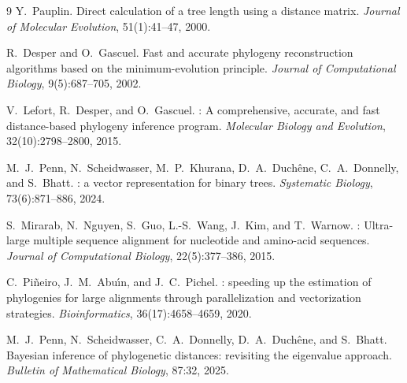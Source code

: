 \documentclass[11pt,a4paper]{article}
\makeatletter
\DeclareRobustCommand{\_}{\ifmmode\nfss@text{\textunderscore}\else\textunderscore\allowbreak\fi}
\theoremstyle{definition}
\makeatother
\begin{document}
\begin{thebibliography}{9}
Y.~Pauplin.
\newblock Direct calculation of a tree length using a distance matrix.
\newblock \emph{Journal of Molecular Evolution}, 51(1):41--47, 2000.

R.~Desper and O.~Gascuel.
\newblock Fast and accurate phylogeny reconstruction algorithms based on the minimum-evolution principle.
\newblock \emph{Journal of Computational Biology}, 9(5):687--705, 2002.

V.~Lefort, R.~Desper, and O.~Gascuel.
: A comprehensive, accurate, and fast distance-based phylogeny inference program.
\newblock \emph{Molecular Biology and Evolution}, 32(10):2798--2800, 2015.

M.~J.~Penn, N.~Scheidwasser, M.~P.~Khurana, D.~A.~Duch\^ene, C.~A.~Donnelly, and S.~Bhatt.
: a vector representation for binary trees.
\newblock \emph{Systematic Biology}, 73(6):871--886, 2024.

S.~Mirarab, N.~Nguyen, S.~Guo, L.-S.~Wang, J.~Kim, and T.~Warnow.
: Ultra-large multiple sequence alignment for nucleotide and amino-acid sequences.
\newblock \emph{Journal of Computational Biology}, 22(5):377--386, 2015.

C.~Pi\~neiro, J.~M.~Abu\'\i n, and J.~C.~Pichel.
: speeding up the estimation of phylogenies for large alignments through parallelization and vectorization strategies.
\newblock \emph{Bioinformatics}, 36(17):4658--4659, 2020.

M.~J.~Penn, N.~Scheidwasser, C.~A.~Donnelly, D.~A.~Duch\^ene, and S.~Bhatt.
\newblock Bayesian inference of phylogenetic distances: revisiting the eigenvalue approach.
\newblock \emph{Bulletin of Mathematical Biology}, 87:32, 2025.
\end{thebibliography}
\end{document}
